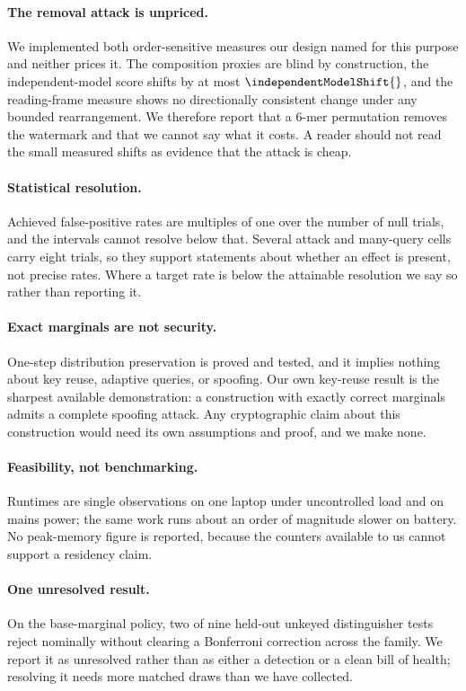 \paragraph{The removal attack is unpriced.} We implemented both order-sensitive measures our design
named for this purpose and neither prices it. The composition proxies are blind by construction, the
independent-model score shifts by at most $\independentModelShift{}$, and the reading-frame measure
shows no directionally consistent change under any bounded rearrangement. We therefore report that a
6-mer permutation removes the watermark and that we cannot say what it costs. A reader should not read
the small measured shifts as evidence that the attack is cheap.

\paragraph{Statistical resolution.} Achieved false-positive rates are multiples of one over the number
of null trials, and the intervals cannot resolve below that. Several attack and many-query cells carry
eight trials, so they support statements about whether an effect is present, not precise rates. Where a
target rate is below the attainable resolution we say so rather than reporting it.

\paragraph{Exact marginals are not security.} One-step distribution preservation is proved and tested,
and it implies nothing about key reuse, adaptive queries, or spoofing. Our own key-reuse result is the
sharpest available demonstration: a construction with exactly correct marginals admits a complete
spoofing attack. Any cryptographic claim about this construction would need its own assumptions and
proof, and we make none.

\paragraph{Feasibility, not benchmarking.} Runtimes are single observations on one laptop under
uncontrolled load and on mains power; the same work runs about an order of magnitude slower on battery.
No peak-memory figure is reported, because the counters available to us cannot support a residency
claim.

\paragraph{One unresolved result.} On the base-marginal policy, two of nine held-out unkeyed
distinguisher tests reject nominally without clearing a Bonferroni correction across the family. We
report it as unresolved rather than as either a detection or a clean bill of health; resolving it needs
more matched draws than we have collected.
